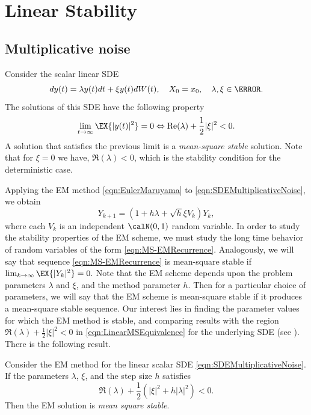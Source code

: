\section*{Linear Stability}
	\subsection*{Multiplicative noise}
		Consider the scalar linear SDE
		\begin{equation}\label{eqn:SDEMultiplicativeNoise}
			dy(t)=\lambda y(t)dt+\xi y(t) dW(t) , \quad X_0=x_0,  \quad \lambda,\xi \in \C.
		\end{equation}
		The solutions of this SDE have the following property
		\begin{equation}\label{eqn:LinearMSEquivalence}
			\lim_{t\to\infty} \EX{|y(t)|^2} = 0 \Leftrightarrow \Re(\lambda) +\frac{1}{2} |\xi|^ 2 <0.
		\end{equation}
		A solution that satisfies  the previous limit  is a \emph{mean-square stable} solution. 
		Note that for $\xi = 0$ we have, $\Re(\lambda)<0$, which is the stability condition  for the deterministic case.
			
			Applying the EM method \eqref{eqn:EulerMaruyama} to \eqref{eqn:SDEMultiplicativeNoise}, we obtain
		\begin{equation}\label{eqn:MS-EMRecurrence}
			Y_{k+1} = \left(1 + h\lambda + \sqrt{h}\xi V_k\right)Y_k,
		\end{equation}
		where each $V_k$ is an independent $\calN(0,1)$ random variable. 
		In order to study the stability properties of the EM scheme, we must study
		the long time behavior of random variables of the form \eqref{eqn:MS-EMRecurrence}.
		Analogously, we will say that sequence \eqref{eqn:MS-EMRecurrence} is mean-square stable if 
		$
			\lim_{k \to  \infty}
				\EX{|Y_k|^2} = 0.
		$
		Note that the EM scheme depends upon the problem parameters $\lambda$ and  $\xi$, and the method
		parameter $h$. Then for a particular choice of parameters, we will say that the EM scheme is mean-square stable 
		if it produces a mean-square stable sequence. 
		Our interest lies in finding the parameter values for which the EM method is stable, and comparing results
		with the region $\Re(\lambda) + \frac{1}{2}|\xi|^2 < 0$ in \eqref{eqn:LinearMSEquivalence}
		for the underlying SDE (see ). There is the following 
		result. 
		\begin{thm}
			Consider the EM method for the linear scalar SDE \eqref{eqn:SDEMultiplicativeNoise}. If the parameters 
			$\lambda$, $\xi$, and the step size $h$ satisfies
			$$
				\Re(\lambda) + \frac{1}{2}
				\left( |\xi|^2 + h|\lambda|^2\right) <0.
			$$
			Then the EM solution is \emph{mean square stable}.
		\end{thm}
		
